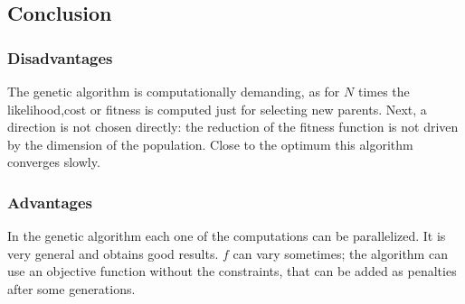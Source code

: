   \subsection{Conclusion}

    \subsubsection{Disadvantages}
    The genetic algorithm is computationally demanding, as for $N$ times the likelihood,cost or fitness is computed just for selecting new parents.
    Next, a direction is not chosen directly: the reduction of the fitness function is not driven by the dimension of the population.
    Close to the optimum this algorithm converges slowly.

    \subsubsection{Advantages}
    In the genetic algorithm each one of the computations can be parallelized.
    It is very general and obtains good results.
    \(f\) can vary sometimes; the algorithm can use an objective function without the constraints, that can be added as penalties after some generations.
